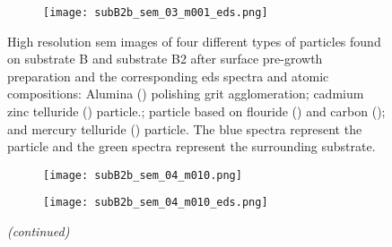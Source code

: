 \begin{figure}[htbp]
\begin{subfigure}[t]{\textwidth}
          \hfill
          \begin{minipage}[c]{0.43\linewidth}
            \centering
            \texttt{[image: subB2b\_sem\_03\_m001\_eds.png]}
          \end{minipage}
          \begin{minipage}[c]{0.11\linewidth}
            \centering
            \atomicTable[\ce{F}&\SI{55.8}{}][\ce{C}&\SI{22.5}{}][\ce{Cd}&\SI{10.6}{}][\ce{Te}&\SI{10.4}{}][\ce{O}&\SI{0.4}{}][\ce{Zn}&\SI{0.2}{}][\ce{Si}&\SI{0.1}{}] %
          \end{minipage}
    \end{subfigure}
    \caption[\Ac{sem} images, \ac{eds} spectra, and \ac{eds} atomic compositions of four different types of particles found on substrate B and substrate B2 after surface pre-growth preparation.]{High resolution \ac{sem} images of four different types of particles found on substrate B and substrate B2 after surface pre-growth preparation and the corresponding \ac{eds} spectra and atomic compositions:  Alumina () polishing grit agglomeration;  cadmium zinc telluride () particle.;  particle based on flouride () and carbon (); and  mercury telluride () particle. The blue spectra represent the particle and the green spectra represent the surrounding substrate.}\label{fig:subBb_sem_w_eds}
\end{figure}
%
\begin{figure}[htbp]
\ContinuedFloat
    \centering
    \begin{subfigure}[t]{\textwidth}
        \caption{}\label{fig:subB2b_mct}
          \begin{minipage}[c]{0.43\linewidth}
            \centering
            \texttt{[image: subB2b\_sem\_04\_m010.png]}
          \end{minipage}
          \hfill
          \begin{minipage}[c]{0.43\linewidth}
            \centering
            \texttt{[image: subB2b\_sem\_04\_m010\_eds.png]}
          \end{minipage}
          \begin{minipage}[c]{0.11\linewidth}
            \centering
            \atomicTable[\ce{Te}&\SI{35.7}{}][\ce{Hg}&\SI{31.0}{}][\ce{C}&\SI{30.4}{}][\ce{Cd}&\SI{2.81}{}][\ce{Zn}&\SI{0.1}{}]%
          \end{minipage}
    \end{subfigure}
    \captionsetup{list=no}
    \caption{\emph{(continued)}}
\end{figure}

